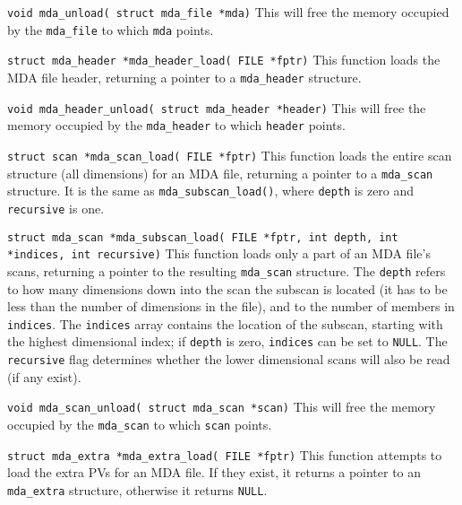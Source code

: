 \documentclass[10pt,letterpaper]{article}
\begin{document}
\vspace{1.5ex}
\noindent
\verb+void mda_unload( struct mda_file *mda)+ \linebreak 
This will free the memory occupied by the \verb+mda_file+ to which
\verb+mda+ points.

\vspace{1.5ex}
\noindent
\verb+struct mda_header *mda_header_load( FILE *fptr)+ \linebreak
This function loads the MDA file header, returning a pointer to a
\verb+mda_header+ structure.

\vspace{1.5ex}
\noindent
\verb+void mda_header_unload( struct mda_header *header)+ \linebreak
This will free the memory occupied by the \verb+mda_header+ to which
\verb+header+ points.

\vspace{1.5ex}
\noindent
\verb+struct scan *mda_scan_load( FILE *fptr)+ \linebreak
This function loads the entire scan structure (all dimensions) for an
MDA file, returning a pointer to a \verb+mda_scan+ structure.  It is
the same as \verb+mda_subscan_load()+, where \verb+depth+ is zero and
\verb+recursive+ is one.


\vspace{1.5ex}
\noindent
\verb+struct mda_scan *mda_subscan_load( FILE *fptr, int depth, int *indices, int recursive)+ \linebreak
This function loads only a part of an MDA file's scans, returning a
pointer to the resulting \verb+mda_scan+ structure.  The \verb+depth+
refers to how many dimensions down into the scan the subscan is
located (it has to be less than the number of dimensions in the file),
and to the number of members in \verb+indices+.  The \verb+indices+
array contains the location of the subscan, starting with the highest
dimensional index; if \verb+depth+ is zero, \verb+indices+ can be set
to \verb+NULL+.  The \verb+recursive+ flag determines whether the
lower dimensional scans will also be read (if any exist).

\vspace{1.5ex}
\noindent
\verb+void mda_scan_unload( struct mda_scan *scan)+ \linebreak
This will free the memory occupied by the \verb+mda_scan+ to which
\verb+scan+ points.

\vspace{1.5ex}
\noindent
\verb+struct mda_extra *mda_extra_load( FILE *fptr)+ \linebreak
This function attempts to load the extra PVs for an MDA file. If they
exist, it returns a pointer to an \verb+mda_extra+ structure,
otherwise it returns \verb+NULL+.
\end{document}

